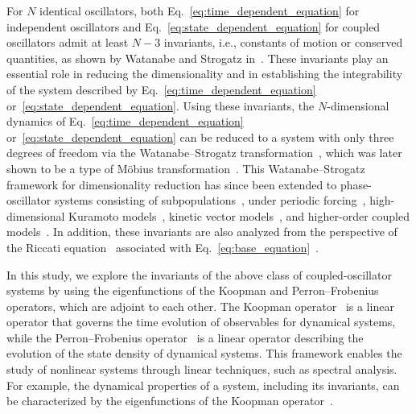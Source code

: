 \documentclass[
amsmath,amssymb,
]{revtex4-2}
\begin{document}
For $N$ identical oscillators, 
both Eq.~\eqref{eq:time_dependent_equation} for 
independent oscillators and Eq.~\eqref{eq:state_dependent_equation} for 
coupled oscillators
admit at least $N-3$ invariants, i.e., constants of motion 
or conserved quantities, as shown by Watanabe and Strogatz in~\cite{Watanabe1993integrability}. 
% 
These invariants play an essential role in reducing the dimensionality and in establishing the integrability of the system described by Eq.~\eqref{eq:time_dependent_equation} or~\eqref{eq:state_dependent_equation}.
%
Using these invariants, the $N$-dimensional dynamics of Eq.~\eqref{eq:time_dependent_equation} or~\eqref{eq:state_dependent_equation} can be
reduced to a system with only three degrees of freedom via the Watanabe--Strogatz transformation~\cite{Watanabe1993integrability},
%
which was later shown to be a type of M\"{o}bius transformation~\cite{Marvel2009identical}.
% 
This Watanabe--Strogatz framework for dimensionality reduction has since been extended to phase-oscillator systems consisting of subpopulations~\cite{Pikovsky2008partially,hong2011conformists}, under periodic forcing~\cite{atsumi2012persistent}, high-dimensional Kuramoto models~\cite{lohe2018vector}, kinetic vector models~\cite{park2022kinetic}, and higher-order coupled models~\cite{jain2025higher}.
In addition, these invariants are also analyzed from the perspective of the Riccati equation~\cite{reid1972riccati} associated with Eq.~\eqref{eq:base_equation}~\cite{Marvel2009identical,cestnik2024integrability,pazo2025spiking}. 
%

In this study, we explore the invariants of the above class of coupled-oscillator systems by using the eigenfunctions of the Koopman and Perron--Frobenius operators, which are adjoint to each other.
% 
The Koopman operator~\cite{Koopman1931hamiltonian,Koopman1932spectra,lasota2013chaos,mezic2005spectral,budivsic2012applied,mezic2013analysis,mauroy2020koopman,brunton2022modern} is a linear operator that governs the time evolution of observables for dynamical systems, while the Perron--Frobenius operator~\cite{mezic2005spectral,Gaspard_1998,lasota2013chaos,brunton2022modern} is a linear operator describing the evolution of the state density of dynamical systems.
%
This framework enables the study of nonlinear systems through linear techniques, such as spectral analysis. For example, the dynamical properties of a system, including its invariants, can be characterized by the eigenfunctions of the Koopman operator~\cite{budivsic2012applied,mauroy2013isostables,shirasaka2017phase,taga2021koopman,parker2023koopman,taga2024dynamic}.
\end{document}
